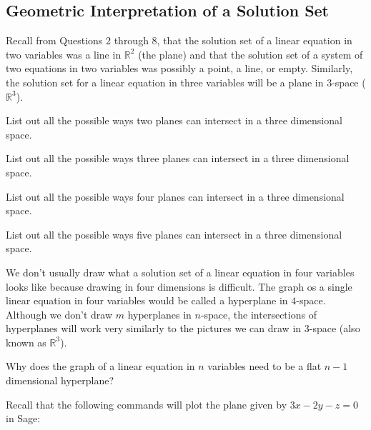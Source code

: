 \subsection{Geometric Interpretation of a Solution Set}

Recall from Questions 2 through 8, that the solution set of a linear equation in two variables was a line in $\mathbb{R}^2$ (the plane) and that the solution set of a system of two equations in two variables was possibly a point, a line, or empty. Similarly, the solution set for a linear equation in three variables will be a plane in 3-space ($\mathbb{R}^3$).

\begin{question}\be
\item List out all the possible ways two planes can intersect in a three dimensional space.
\item List out all the possible ways three planes can intersect in a three dimensional space.
\item List out all the possible ways four planes can intersect in a three dimensional space.
\item List out all the possible ways five planes can intersect in a three dimensional space.
\begin{annotation}
\end{annotation}
\ee
\end{question}

We don't usually draw what a solution set of a linear equation in four variables looks like because drawing in four dimensions is difficult. The graph os a single linear equation in four variables would be called a hyperplane in $4$-space. Although we don't draw $m$ hyperplanes in $n$-space, the intersections of hyperplanes will work very similarly to the pictures we can draw in 3-space (also known as $\mathbb{R}^3$).

\bq Why does the graph of a linear equation in $n$ variables need to be a flat $n-1$ dimensional hyperplane?
\eq

Recall that the following commands will plot the plane given by $3x-2y-z=0$ in Sage:

